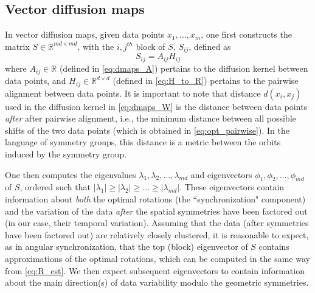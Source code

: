 \documentclass[12pt]{article}
\begin{document}
\subsection{Vector diffusion maps\cite{singer2012vector}}

In vector diffusion maps, given data points $x_1, \dots, x_m$, one first constructs the matrix $S \in \mathbb{R}^{md \times md}$, with the $i,j^{th}$ block of $S$, $S_{ij}$, defined as
\begin{equation} \label{eq:vdm_S}
	S_{ij} = A_{ij} H_{ij}
\end{equation}
%
where $A_{ij} \in \mathbb{R}$ (defined in \eqref{eq:dmaps_A}) pertains to the diffusion kernel between data points, and $H_{ij} \in \mathbb{R}^{d \times d}$ (defined in \eqref{eq:H_to_R}) pertains to the pairwise alignment between data points.
%
It is important to note that distance $d(x_i, x_j)$ used in the diffusion kernel in \eqref{eq:dmaps_W} is the distance between data points {\it after} after pairwise alignment, i.e., the minimum distance between all possible shifts of the two data points (which is obtained in \eqref{eq:opt_pairwise}).
%
In the language of symmetry groups, this distance is a metric between the orbits induced by the symmetry group.

One then computes the eigenvalues $\lambda_1, \lambda_2, \dots, \lambda_{md}$ and eigenvectors $\phi_1, \phi_2, \dots, \phi_{md}$ of $S$, ordered such that $|\lambda_1| \ge |\lambda_2| \ge \dots \ge |\lambda_{md}|$.
%
These eigenvectors contain information about {\it both} the optimal rotations (the ``synchronization" component) and the
variation of the data {\it after} the spatial symmetries have been factored out (in our case, their temporal variation).
%
Assuming that the data (after symmetries have been factored out) are relatively closely clustered, it is reasonable
to expect, as in angular synchronization, that the top (block) eigenvector of $S$ contains approximations of the optimal rotations,
which can be computed in the same way from \eqref{eq:R_est}.
%
We then expect subsequent eigenvectors to contain information about the main direction(s) of data variability modulo the geometric symmetries.
%
\end{document}
